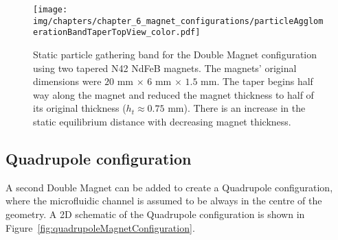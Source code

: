 \begin{figure}[htb]
\centering
		\texttt{[image: img/chapters/chapter\_6\_magnet\_configurations/particleAgglomerationBandTaperTopView\_color.pdf]}
\caption[Static particle gathering band for tapered Double Magnet configuration]{Static particle gathering band for the Double Magnet configuration using two tapered N42 NdFeB magnets. The magnets' original dimensions were $20$ mm $\times$ $6$ mm $\times$ $1.5$ mm. The taper begins half way along the magnet and reduced the magnet thickness to half of its original thickness ($h_{t}\approx 0.75$ mm). There is an increase in the static equilibrium distance with decreasing magnet thickness.}
\label{fig:taperedMagnetGatheringPointExperiment}
\end{figure}


\subsection{Quadrupole configuration}\label{subsec:quadrupoleMagnetConfiguration}
A second Double Magnet can be added to create a Quadrupole configuration, where the microfluidic channel is assumed to be always in the centre of the geometry. A 2D schematic of the Quadrupole configuration is shown in Figure~\ref{fig:quadrupoleMagnetConfiguration}.

